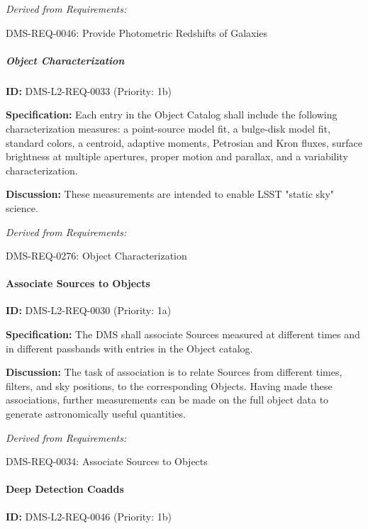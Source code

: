 \documentclass[SE,toc,lsstdraft]{lsstdoc}
\begin{document}
\emph{Derived from Requirements:}

DMS-REQ-0046:
Provide Photometric Redshifts of Galaxies \newline

\subparagraph{Object Characterization}\hfill  %

\label{DMS-L2-REQ-0033}
\textbf{ID:} DMS-L2-REQ-0033 (Priority: 1b)

\textbf{Specification:} Each entry in the Object Catalog shall include the following characterization measures: a point-source model fit, a bulge-disk model fit, standard colors, a centroid, adaptive moments, Petrosian and Kron fluxes, surface brightness at multiple apertures, proper motion and parallax, and a variability characterization.

\textbf{Discussion: }These measurements are intended to enable LSST "static sky" science.

\emph{Derived from Requirements:}

DMS-REQ-0276:
Object Characterization \newline

\paragraph{Associate Sources to Objects}\hfill  %

\label{DMS-L2-REQ-0030}
\textbf{ID:} DMS-L2-REQ-0030 (Priority: 1a)

\textbf{Specification:} The DMS shall associate Sources measured at different times and in different passbands with entries in the Object catalog.

\textbf{Discussion:} The task of association is to relate Sources from different times, filters, and sky positions, to the corresponding Objects. Having made these associations, further measurements can be made on the full object data to generate astronomically useful quantities.

\emph{Derived from Requirements:}

DMS-REQ-0034:
Associate Sources to Objects \newline

\paragraph{Deep Detection Coadds}\hfill  %

\label{DMS-L2-REQ-0046}
\textbf{ID:} DMS-L2-REQ-0046 (Priority: 1b)
\end{document}
